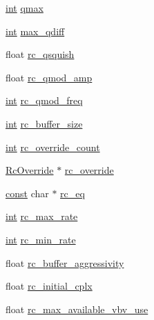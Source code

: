 \begin{DoxyCompactItemize}
\item 
\hyperlink{xmltok_8h_a5a0d4a5641ce434f1d23533f2b2e6653}{int} \hyperlink{struct_a_v_codec_context_ab015db3b7fcd227193a7c17283914187}{qmax}
\item 
\hyperlink{xmltok_8h_a5a0d4a5641ce434f1d23533f2b2e6653}{int} \hyperlink{struct_a_v_codec_context_a08becf306e0984857919f777c4c2ebdb}{max\+\_\+qdiff}
\item 
float \hyperlink{struct_a_v_codec_context_a86d7bef19235330f23d21cf65c01a956}{rc\+\_\+qsquish}
\item 
float \hyperlink{struct_a_v_codec_context_a3bb9c866147b87f945dc25290db94423}{rc\+\_\+qmod\+\_\+amp}
\item 
\hyperlink{xmltok_8h_a5a0d4a5641ce434f1d23533f2b2e6653}{int} \hyperlink{struct_a_v_codec_context_a0ea3bb6334a7b2bbc4e762f35ca7f473}{rc\+\_\+qmod\+\_\+freq}
\item 
\hyperlink{xmltok_8h_a5a0d4a5641ce434f1d23533f2b2e6653}{int} \hyperlink{struct_a_v_codec_context_a15000607a7e2371162348bb35b0184c1}{rc\+\_\+buffer\+\_\+size}
\item 
\hyperlink{xmltok_8h_a5a0d4a5641ce434f1d23533f2b2e6653}{int} \hyperlink{struct_a_v_codec_context_a5491e9920ab3df5fc32aa6de0cb03c22}{rc\+\_\+override\+\_\+count}
\item 
\hyperlink{struct_rc_override}{Rc\+Override} $\ast$ \hyperlink{struct_a_v_codec_context_adaabc10c6216da54ddf1aa454d64418c}{rc\+\_\+override}
\item 
\hyperlink{getopt1_8c_a2c212835823e3c54a8ab6d95c652660e}{const} char $\ast$ \hyperlink{struct_a_v_codec_context_a5f58c561e939b0bbd9a149dafe5768eb}{rc\+\_\+eq}
\item 
\hyperlink{xmltok_8h_a5a0d4a5641ce434f1d23533f2b2e6653}{int} \hyperlink{struct_a_v_codec_context_a055dd5071b96565ab541d4c775e7f1f3}{rc\+\_\+max\+\_\+rate}
\item 
\hyperlink{xmltok_8h_a5a0d4a5641ce434f1d23533f2b2e6653}{int} \hyperlink{struct_a_v_codec_context_a5829c395fd6328c258379f2c3c11d40d}{rc\+\_\+min\+\_\+rate}
\item 
float \hyperlink{struct_a_v_codec_context_a61eb50e6362b69b6efdf0031b79f2395}{rc\+\_\+buffer\+\_\+aggressivity}
\item 
float \hyperlink{struct_a_v_codec_context_ac2ba8e7263aaf3526d5f92eb9ebb6d9c}{rc\+\_\+initial\+\_\+cplx}
\item 
float \hyperlink{struct_a_v_codec_context_a023d28b8d65fe09ded1987cdea18dddb}{rc\+\_\+max\+\_\+available\+\_\+vbv\+\_\+use}
\item 

\end{DoxyCompactItemize}
